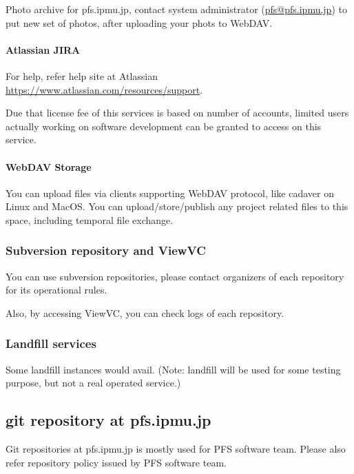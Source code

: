 \documentclass[a4paper,notitlepage]{article}
\begin{document}
Photo archive for pfs.ipmu.jp, 
contact system administrator (\url{pfs@pfs.ipmu.jp}) to put new 
set of photos, after uploading your phots to WebDAV. 


\paragraph{Atlassian JIRA}
\label{sec:pfs-jira}

For help, refer help site at Atlassian 
\url{https://www.atlassian.com/resources/support}.

Due that license fee of this services is based on number of accounts, 
limited users actually working on software development can be granted to 
access on this service. 


\paragraph{WebDAV Storage}
\label{sec:pfs-webdav}

You can upload files via clients supporting WebDAV protocol, like cadaver on 
Linux and MacOS. 
You can upload/store/publish any project related files to this space, 
including temporal file exchange. 

\subsubsection{Subversion repository and ViewVC}

You can use subversion repositories, please contact organizers of each 
repository for its operational rules. 

Also, by accessing ViewVC, you can check logs of each repository. 

\subsubsection{Landfill services}

Some landfill instances would avail. 
(Note: landfill will be used for some testing purpose, but not a real 
operated service.) 


\subsection{git repository at pfs.ipmu.jp}
\label{sec:pfs-gitolite}

Git repositories at pfs.ipmu.jp is mostly used for PFS software team.
Please also refer repository policy issued by PFS software team. 
\end{document}
